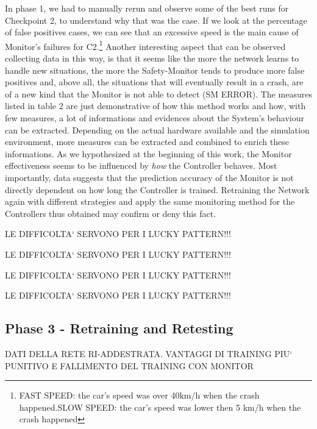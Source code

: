 In phase 1, we had to manually rerun and observe some of the best runs for Checkpoint 2, to understand why that was the case. If we look at the percentage of false positives cases, we can see that an excessive speed is the main cause of Monitor's failures for C2.\footnote{FAST SPEED: the car's speed was over 40km/h when the crash happened.\newline SLOW SPEED: the car's speed was lower then 5 km/h when the crash happened}
Another interesting aspect that can be observed collecting data in this way, is that it seems like the more the network learns to handle new situations, the more the Safety-Monitor tends to produce more false positives and, above all, the situations that will eventually result in a crash, are of a new kind that the Monitor is not able to detect (SM ERROR).\newline
The measures listed in table 2 are just demonstrative of how this method works and how, with few measures, a lot of informations and evidences about the System's behaviour can be extracted. Depending on the actual hardware available and the simulation environment, more measures can be extracted and combined to enrich these informations.\newline
As we hypothesized at the beginning of this work, the Monitor effectiveness seems to be influenced by \textsl{how} the Controller behaves. Most importantly, data suggests that the prediction accuracy of the Monitor is not directly dependent on how long the Controller is trained. Retraining the Network again with different strategies and apply the same monitoring method for the Controllers thus obtained may confirm or deny this fact.


LE DIFFICOLTA` SERVONO PER I LUCKY PATTERN!!!

LE DIFFICOLTA` SERVONO PER I LUCKY PATTERN!!!

LE DIFFICOLTA` SERVONO PER I LUCKY PATTERN!!!

LE DIFFICOLTA` SERVONO PER I LUCKY PATTERN!!!





\subsection{Phase 3 - Retraining and Retesting}

DATI DELLA RETE RI-ADDESTRATA. VANTAGGI DI TRAINING PIU` PUNITIVO E FALLIMENTO DEL TRAINING CON MONITOR

